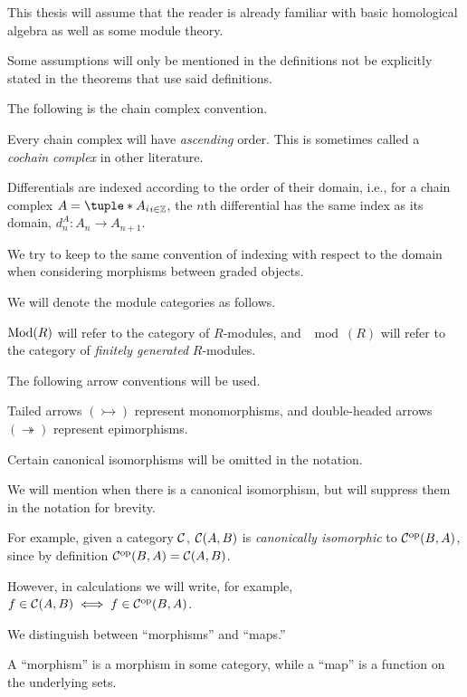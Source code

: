 This thesis will assume that the reader is already familiar with basic homological algebra as well as some module theory.

Some assumptions will only be mentioned in the definitions not be explicitly stated in the theorems that use said definitions.

The following is the chain complex convention.
\begin{notation}
    \label{not:chain_complex}
    Every chain complex will have \emph{ascending} order. This is sometimes called a \emph{cochain complex} in other literature.

    Differentials are indexed according to the order of their domain, i.e., for a chain complex \( A = \tuple*{A_i}_{i \in \Zb} \), the \( n \)th differential has the same index as its domain, \( d_n^A: A_n \to A_{n + 1} \).
    
    We try to keep to the same convention of indexing with respect to the domain when considering morphisms between graded objects.
\end{notation}

We will denote the module categories as follows.
\begin{notation}
    \( \operatorname{Mod}(R) \) will refer to the category of \( R \)-modules, and \( \mod(R) \) will refer to the category of \emph{finitely generated} \( R \)-modules.
\end{notation}

The following arrow conventions will be used.
\begin{notation}
    Tailed arrows \( (\rightarrowtail) \) represent monomorphisms, and double-headed arrows \( (\twoheadrightarrow) \) represent epimorphisms.
\end{notation}

Certain canonical isomorphisms will be omitted in the notation.
\begin{notation}
    \label{not:suppress_canonical_isomorphisms}
    We will mention when there is a canonical isomorphism, but will suppress them in the notation for brevity.

    For example, given a category \( {\mathcal{C}} \), \( {\mathcal{C}}(A, B) \) is \emph{canonically isomorphic} to \( {\mathcal{C}}^{\operatorname{op}}(B, A) \), since by definition \( {\mathcal{C}}^{\operatorname{op}}(B, A) = {\mathcal{C}}(A, B) \).

    However, in calculations we will write, for example, \( f \in {\mathcal{C}}(A, B) \iff f \in {\mathcal{C}}^{\operatorname{op}}(B, A) \).
\end{notation}

We distinguish between ``morphisms'' and ``maps.''
\begin{notation}
    A ``morphism'' is a morphism in some category, while a ``map'' is a function on the underlying sets.
\end{notation}

